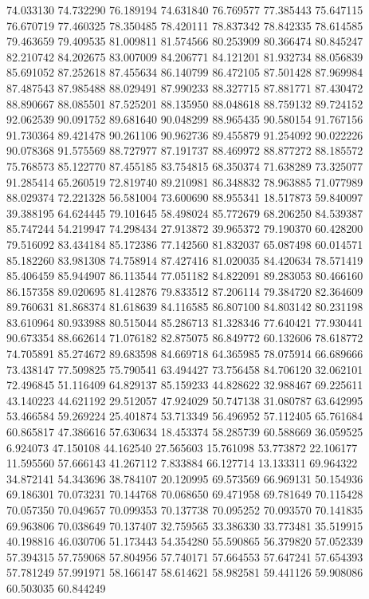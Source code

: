 74.033130
74.732290
76.189194
74.631840
76.769577
77.385443
75.647115
76.670719
77.460325
78.350485
78.420111
78.837342
78.842335
78.614585
79.463659
79.409535
81.009811
81.574566
80.253909
80.366474
80.845247
82.210742
84.202675
83.007009
84.206771
84.121201
81.932734
88.056839
85.691052
87.252618
87.455634
86.140799
86.472105
87.501428
87.969984
87.487543
87.985488
88.029491
87.990233
88.327715
87.881771
87.430472
88.890667
88.085501
87.525201
88.135950
88.048618
88.759132
89.724152
92.062539
90.091752
89.681640
90.048299
88.965435
90.580154
91.767156
91.730364
89.421478
90.261106
90.962736
89.455879
91.254092
90.022226
90.078368
91.575569
88.727977
87.191737
88.469972
88.877272
88.185572
75.768573
85.122770
87.455185
83.754815
68.350374
71.638289
73.325077
91.285414
65.260519
72.819740
89.210981
86.348832
78.963885
71.077989
88.029374
72.221328
56.581004
73.600690
88.955341
18.517873
59.840097
39.388195
64.624445
79.101645
58.498024
85.772679
68.206250
84.539387
85.747244
54.219947
74.298434
27.913872
39.965372
79.190370
60.428200
79.516092
83.434184
85.172386
77.142560
81.832037
65.087498
60.014571
85.182260
83.981308
74.758914
87.427416
81.020035
84.420634
78.571419
85.406459
85.944907
86.113544
77.051182
84.822091
89.283053
80.466160
86.157358
89.020695
81.412876
79.833512
87.206114
79.384720
82.364609
89.760631
81.868374
81.618639
84.116585
86.807100
84.803142
80.231198
83.610964
80.933988
80.515044
85.286713
81.328346
77.640421
77.930441
90.673354
88.662614
71.076182
82.875075
86.849772
60.132606
78.618772
74.705891
85.274672
89.683598
84.669718
64.365985
78.075914
66.689666
73.438147
77.509825
75.790541
63.494427
73.756458
84.706120
32.062101
72.496845
51.116409
64.829137
85.159233
44.828622
32.988467
69.225611
43.140223
44.621192
29.512057
47.924029
50.747138
31.080787
63.642995
53.466584
59.269224
25.401874
53.713349
56.496952
57.112405
65.761684
60.865817
47.386616
57.630634
18.453374
58.285739
60.588669
36.059525
6.924073
47.150108
44.162540
27.565603
15.761098
53.773872
22.106177
11.595560
57.666143
41.267112
7.833884
66.127714
13.133311
69.964322
34.872141
54.343696
38.784107
20.120995
69.573569
66.969131
50.154936
69.186301
70.073231
70.144768
70.068650
69.471958
69.781649
70.115428
70.057350
70.049657
70.099353
70.137738
70.095252
70.093570
70.141835
69.963806
70.038649
70.137407
32.759565
33.386330
33.773481
35.519915
40.198816
46.030706
51.173443
54.354280
55.590865
56.379820
57.052339
57.394315
57.759068
57.804956
57.740171
57.664553
57.647241
57.654393
57.781249
57.991971
58.166147
58.614621
58.982581
59.441126
59.908086
60.503035
60.844249
